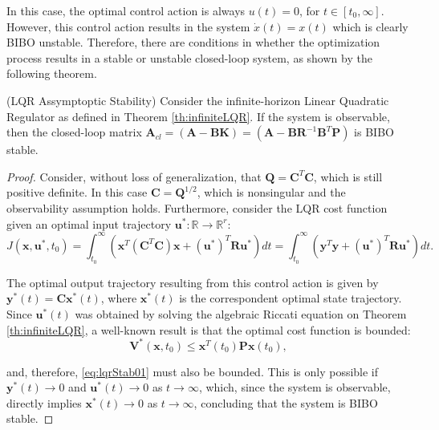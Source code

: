 \documentclass[a4paper,11pt]{book}
\numberwithin{figure}{chapter}
\numberwithin{equation}{chapter}
\numberwithin{table}{chapter}
\newtheorem{theorem}{Theorem}[chapter]
\theoremstyle{definition}
\newcounter{boxed-theorem}
\newenvironment{boxed-theorem}[1]
{\begin{shaded} \begin{theorem}{#1}}
{\end{theorem} \end{shaded}}
\newcounter{boxed-definition}
\begin{document}
In this case, the optimal control action is always $u(t) = 0$, for $t \in [t_0, \infty]$. However, this control action results in the system $\dot{x}(t) = x(t)$ which is clearly BIBO unstable. Therefore, there are conditions in whether the optimization process results in a stable or unstable closed-loop system, as shown by the following theorem.

\begin{boxed-theorem}{(LQR Assymptoptic Stability)} \label{th:lqrStab}
    Consider the infinite-horizon Linear Quadratic Regulator as defined in Theorem \ref{th:infiniteLQR}. If the system is observable, then the closed-loop matrix $\bm{A}_{cl} = (\bm{A} - \bm{B}\bm{K}) = (\bm{A} - \bm{B}\bm{R}^{-1}\bm{B}^T\bm{P})$ is BIBO stable.
\end{boxed-theorem}

\begin{proof}
    Consider, without loss of generalization, that $\bm{Q} = \bm{C}^T \bm{C}$, which is still positive definite. In this case $\bm{C} = \bm{Q}^{1/2}$, which is nonsingular and the observability assumption holds. Furthermore, consider the LQR cost function given an optimal input trajectory $\bm{u}^* : \mathbb{R} \rightarrow \mathbb{R}^r$:
    \begin{equation} \label{eq:lqrStab01}
    J(\bm{x},\bm{u}^*,t_0) = \int_{t_0}^{\infty} \left( \bm{x}^T (\bm{C}^T \bm{C}) \bm{x} + (\bm{u}^*)^T \bm{R} \bm{u}^* \right) dt = \int_{t_0}^{\infty} \left( \bm{y}^T \bm{y} + (\bm{u}^*)^T \bm{R} \bm{u}^* \right) dt
.\end{equation}

The optimal output trajectory resulting from this control action is given by $\bm{y}^*(t) = \bm{C} \bm{x}^*(t)$, where $\bm{x}^*(t)$ is the correspondent optimal state trajectory. Since $\bm{u}^*(t)$ was obtained by solving the algebraic Riccati equation on Theorem \ref{th:infiniteLQR}, a well-known result is that the optimal cost function is bounded:
\begin{equation}
    \bm{V}^*(\bm{x}, t_0) \leq \bm{x}^T(t_0) \bm{P} \bm{x}(t_0)
,\end{equation}

\noindent and, therefore, \eqref{eq:lqrStab01} must also be bounded. This is only possible if $\bm{y}^*(t) \to 0$ and $\bm{u}^*(t) \to 0$ as $t \to \infty$, which, since the system is observable, directly implies $\bm{x}^*(t) \to 0$ as $t \to \infty$, concluding that the system is BIBO stable.
\end{proof}
\end{document}
